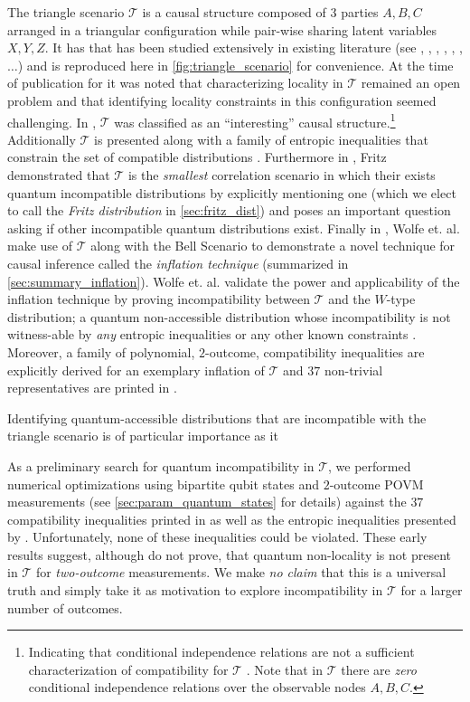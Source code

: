 \documentclass[aps, 10pt, english, twoside, pra, nofootinbib, longbibliography]{revtex4-1}
\theoremstyle{plain}
\theoremstyle{definition}
\theoremstyle{remark}
\newcommand{\ts}{\mathcal{T}}
\begin{document}
    The triangle scenario $\ts$ is a causal structure composed of $3$ parties $A, B, C$ arranged in a triangular configuration while pair-wise sharing latent variables $X, Y, Z$. It has that has been studied extensively in existing literature (see \cite[Fig. 1]{Steudel_2010}, \cite[Fig. 6]{Chaves_2014}, \cite[Fig. 8]{Branciard_2012}, \cite[Fig. 8, Appendix E]{Henson_2014}, \cite[Fig. 3]{Fritz_2012}, \cite[Fig. 1]{Inflation}, $\ldots$) and is reproduced here in \cref{fig:triangle_scenario} for convenience. At the time of publication for \cite{Branciard_2012} it was noted that characterizing locality in $\ts$ remained an open problem and that identifying locality constraints in this configuration seemed challenging. In \cite{Henson_2014}, $\ts$ was classified as an ``interesting'' causal structure.\footnote{Indicating that conditional independence relations are not a sufficient characterization of compatibility for $\ts$ \cite{Henson_2014}. Note that in $\ts$ there are \textit{zero} conditional independence relations over the observable nodes $A, B, C$.} Additionally $\ts$ is presented along with a family of entropic inequalities that constrain the set of compatible distributions \cite{Henson_2014}. Furthermore in \cite{Fritz_2012}, Fritz demonstrated that $\ts$ is the \textit{smallest} correlation scenario in which their exists quantum incompatible distributions by explicitly mentioning one (which we elect to call the \textit{Fritz distribution} in \cref{sec:fritz_dist}) and poses an important question asking if other incompatible quantum distributions exist. Finally in \cite{Inflation}, Wolfe et. al. make use of $\ts$ along with the Bell Scenario to demonstrate a novel technique for causal inference called the \textit{inflation technique} (summarized in \cref{sec:summary_inflation}). Wolfe et. al. validate the power and applicability of the inflation technique by proving incompatibility between $\ts$ and the $W$-type distribution; a quantum non-accessible distribution whose incompatibility is not witness-able by \textit{any} entropic inequalities or any other known constraints \cite{Inflation}. Moreover, a family of polynomial, $2$-outcome, compatibility inequalities are explicitly derived for an exemplary inflation of $\ts$ and $37$ non-trivial representatives are printed in \cite{Inflation}.

    Identifying quantum-accessible distributions that are incompatible with the triangle scenario is of particular importance as it 

    As a preliminary search for quantum incompatibility in $\ts$, we performed numerical optimizations using bipartite qubit states and $2$-outcome POVM measurements (see \cref{sec:param_quantum_states} for details) against the $37$ compatibility inequalities printed in \cite{Inflation} as well as the entropic inequalities presented by \cite{Henson_2014}. Unfortunately, none of these inequalities could be violated. These early results suggest, although do not prove, that quantum non-locality is not present in $\ts$ for \textit{two-outcome} measurements. We make \textit{no claim} that this is a universal truth and simply take it as motivation to explore incompatibility in $\ts$ for a larger number of outcomes.
\end{document}
